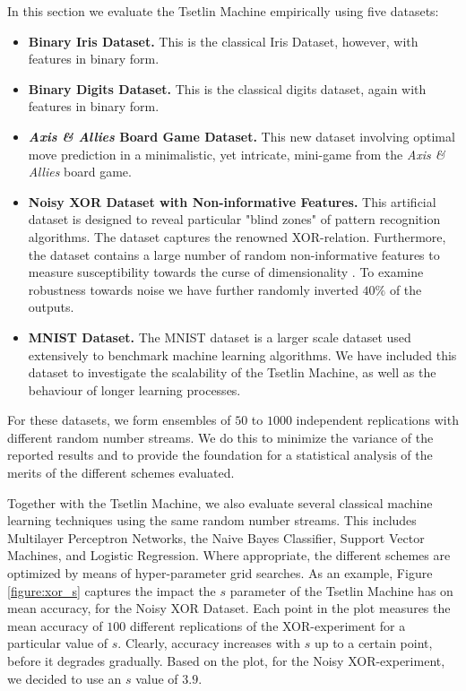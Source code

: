 \documentclass[11pt,a4paper]{article}
\begin{document}
In this section we evaluate the Tsetlin Machine empirically using five datasets:
\begin{itemize}
    \item {\bf Binary Iris Dataset.} This is the classical Iris Dataset, however, with features in binary form.
    \item {\bf Binary Digits Dataset.} This is the classical digits dataset, again with features in binary form.
    \item {\bf \emph{Axis \& Allies} Board Game Dataset.} This new dataset involving optimal move prediction in a minimalistic, yet intricate, mini-game from the \emph{Axis \& Allies} board game.
    \item {\bf Noisy XOR Dataset with Non-informative Features.} This artificial dataset is designed to reveal particular "blind zones" of pattern recognition algorithms. The dataset captures the renowned XOR-relation. Furthermore, the dataset contains a large number of random non-informative features to measure susceptibility towards the curse of dimensionality \cite{Duda2000}. To examine robustness towards noise we have further randomly inverted $40\%$ of the outputs.
    \item {\bf MNIST Dataset.} The MNIST dataset is a larger scale dataset used extensively to benchmark machine learning algorithms. We have included this dataset to investigate the scalability of the Tsetlin Machine, as well as the behaviour of longer learning processes.
\end{itemize}

For these datasets, we form ensembles of $50$ to $1000$ independent replications with different random number streams. We do this to minimize the variance of the reported results and to provide the foundation for a statistical analysis of the merits of the different schemes evaluated. 

Together with the Tsetlin Machine, we also evaluate several classical machine learning techniques using the same random number streams. This  includes Multilayer Perceptron Networks, the Naive Bayes Classifier, Support Vector Machines, and Logistic Regression. Where appropriate, the different schemes are optimized by means of hyper-parameter grid searches.
As an example, Figure \ref{figure:xor_s} captures the impact the $s$ parameter of the Tsetlin Machine has on mean accuracy, for the Noisy XOR Dataset. Each point in the plot measures the mean accuracy of $100$ different replications of the XOR-experiment for a particular value of $s$. Clearly, accuracy increases with $s$ up to a certain point, before it degrades gradually. Based on the plot, for the Noisy XOR-experiment, we decided to use an $s$ value of $3.9$.
\end{document}
